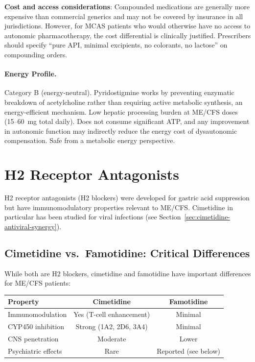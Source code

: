 \textbf{Cost and access considerations}: Compounded medications are generally more expensive than commercial generics and may not be covered by insurance in all jurisdictions. However, for MCAS patients who would otherwise have no access to autonomic pharmacotherapy, the cost differential is clinically justified. Prescribers should specify ``pure API, minimal excipients, no colorants, no lactose'' on compounding orders.

\paragraph{Energy Profile.}
Category B (energy-neutral). Pyridostigmine works by preventing enzymatic breakdown of acetylcholine rather than requiring active metabolic synthesis, an energy-efficient mechanism. Low hepatic processing burden at ME/CFS doses (15--60~mg total daily). Does not consume significant ATP, and any improvement in autonomic function may indirectly reduce the energy cost of dysautonomic compensation. Safe from a metabolic energy perspective.

\section{H2 Receptor Antagonists}
\label{sec:h2-blockers}

H2 receptor antagonists (H2 blockers) were developed for gastric acid suppression but have immunomodulatory properties relevant to ME/CFS. Cimetidine in particular has been studied for viral infections (see Section~\ref{sec:cimetidine-antiviral-synergy}).

\subsection{Cimetidine vs.\ Famotidine: Critical Differences}
\label{sec:h2-comparison}

While both are H2 blockers, cimetidine and famotidine have important differences for ME/CFS patients:

\begin{table}[h]
\centering
\begin{tabular}{lcc}
\toprule
\textbf{Property} & \textbf{Cimetidine} & \textbf{Famotidine} \\
\midrule
Immunomodulation & Yes (T-cell enhancement) & Minimal \\
CYP450 inhibition & Strong (1A2, 2D6, 3A4) & Minimal \\
CNS penetration & Moderate & Lower \\
Psychiatric effects & Rare & Reported (see below) \\
\bottomrule
\end{tabular}
\end{table}

